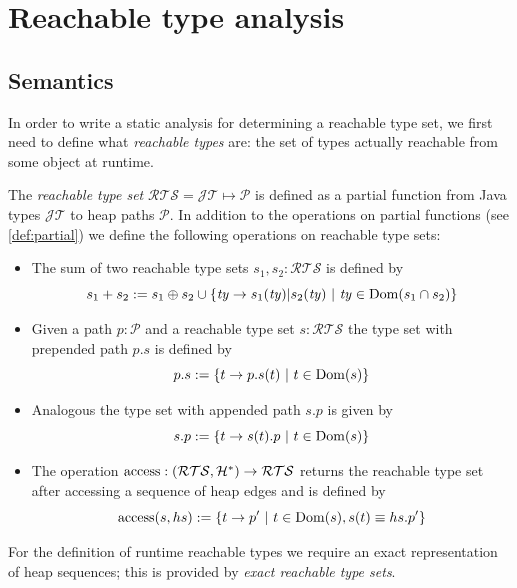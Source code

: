 \chapter{Reachable type analysis}
\label{chap:rta}
\section{Semantics}
In order to write a static analysis for determining a reachable type set, we first need to define what \emph{reachable types} are: the set of types actually reachable from some object at runtime.
\begin{definition}
\label{def:rts}
The \emph{reachable type set} $\mathcal{RTS} = \mathcal{JT} \mapsto \mathcal{P}$ is defined as a partial function from Java types $\mathcal{JT}$ to heap paths $\mathcal{P}$.
In addition to the operations on partial functions (see \cref{def:partial}) we define the following operations on reachable type sets:
\begin{itemize}
    \item The sum of two reachable type sets $s_1, s_2 : \mathcal{RTS}$ is defined by \[ s_1 + s_2 := s_1 \oplus s_2 \cup \{ \mathit{ty} \to s_1(\mathit{ty}) | s_2(\mathit{ty}) \ |\ \mathit{ty} \in \Dom(s_1 \cap s_2) \} \]
    \item Given a path $p : \mathcal{P}$ and a reachable type set $s : \mathcal{RTS}$ the type set with prepended path $p.s$ is defined by \[ p.s :=  \{ t \to p.s(t)\ |\ t \in \operatorname{Dom}(s) \} \]
    \item Analogous the type set with appended path $s.p$ is given by \[ s.p :=  \{t \to s(t).p\ |\ t \in \operatorname{Dom}(s) \} \]
    \item The operation $\operatorname{access} : (\mathcal{RTS}, \mathcal{H}^*) \to \mathcal{RTS}$ returns the reachable type set after accessing a sequence of heap edges and is defined by
    \[ 
    \operatorname{access}(s, hs) := \{ t \to p' \ |\ t \in \operatorname{Dom}(s), s(t) \equiv hs.p' \}
    \]
\end{itemize}
\end{definition}
For the definition of runtime reachable types we require an exact representation of heap sequences; this is provided by \emph{exact reachable type sets}.
